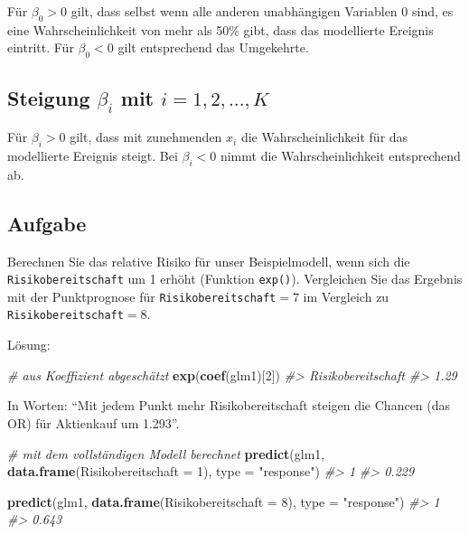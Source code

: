 \documentclass[12pt,ngerman,]{book}
\makeatletter
\newenvironment{Shaded}{\begin{snugshade}}{\end{snugshade}}
\newcommand{\KeywordTok}[1]{\textcolor[rgb]{0.13,0.29,0.53}{\textbf{{#1}}}}
\newcommand{\DataTypeTok}[1]{\textcolor[rgb]{0.13,0.29,0.53}{{#1}}}
\newcommand{\DecValTok}[1]{\textcolor[rgb]{0.00,0.00,0.81}{{#1}}}
\newcommand{\StringTok}[1]{\textcolor[rgb]{0.31,0.60,0.02}{{#1}}}
\newcommand{\CommentTok}[1]{\textcolor[rgb]{0.56,0.35,0.01}{\textit{{#1}}}}
\newcommand{\NormalTok}[1]{{#1}}
\newenvironment{kframe}{%
\medskip{}
\setlength{\fboxsep}{.8em}
 \def\at@end@of@kframe{}%
 \ifinner\ifhmode%
  \def\at@end@of@kframe{\end{minipage}}%
  \begin{minipage}{\columnwidth}%
 \fi\fi%
 \def\FrameCommand##1{\hskip\@totalleftmargin \hskip-\fboxsep
 \colorbox{shadecolor}{##1}\hskip-\fboxsep
     \hskip-\linewidth \hskip-\@totalleftmargin \hskip\columnwidth}%
 \MakeFramed {\advance\hsize-\width
   \@totalleftmargin\z@ \linewidth\hsize
   \@setminipage}}%
 {\par\unskip\endMakeFramed%
 \at@end@of@kframe}
\renewenvironment{Shaded}{\begin{kframe}}{\end{kframe}}
\theoremstyle{definition}
\theoremstyle{definition}
\theoremstyle{remark}
\makeatother
\begin{document}
Für \(\beta_0>0\) gilt, dass selbst wenn alle anderen unabhängigen
Variablen \(0\) sind, es eine Wahrscheinlichkeit von mehr als 50\% gibt,
dass das modellierte Ereignis eintritt. Für \(\beta_0<0\) gilt
entsprechend das Umgekehrte.

\subsection{\texorpdfstring{Steigung \(\beta_i\) mit
\(i=1,2,...,K\)}{Steigung \textbackslash{}beta\_i mit i=1,2,...,K}}\label{steigung-beta_i-mit-i12...k}

Für \(\beta_i>0\) gilt, dass mit zunehmenden \(x_i\) die
Wahrscheinlichkeit für das modellierte Ereignis steigt. Bei
\(\beta_i<0\) nimmt die Wahrscheinlichkeit entsprechend ab.

\subsection{Aufgabe}\label{aufgabe}

Berechnen Sie das relative Risiko für unser Beispielmodell, wenn sich
die \texttt{Risikobereitschaft} um 1 erhöht (Funktion \texttt{exp()}).
Vergleichen Sie das Ergebnis mit der Punktprognose für
\texttt{Risikobereitschaft}\(=7\) im Vergleich zu
\texttt{Risikobereitschaft}\(=8\).

Lösung:

\begin{Shaded}
\begin{Highlighting}[]
\CommentTok{# aus Koeffizient abgeschätzt}
\KeywordTok{exp}\NormalTok{(}\KeywordTok{coef}\NormalTok{(glm1)[}\DecValTok{2}\NormalTok{])}
\CommentTok{#> Risikobereitschaft }
\CommentTok{#>               1.29}
\end{Highlighting}
\end{Shaded}

In Worten: ``Mit jedem Punkt mehr Risikobereitschaft steigen die Chancen
(das OR) für Aktienkauf um 1.293''.

\begin{Shaded}
\begin{Highlighting}[]

\CommentTok{# mit dem vollständigen Modell berechnet}
\KeywordTok{predict}\NormalTok{(glm1, }\KeywordTok{data.frame}\NormalTok{(}\DataTypeTok{Risikobereitschaft =} \DecValTok{1}\NormalTok{), }
        \DataTypeTok{type =} \StringTok{"response"}\NormalTok{)}
\CommentTok{#>     1 }
\CommentTok{#> 0.229}

\KeywordTok{predict}\NormalTok{(glm1, }\KeywordTok{data.frame}\NormalTok{(}\DataTypeTok{Risikobereitschaft =} \DecValTok{8}\NormalTok{), }
        \DataTypeTok{type =} \StringTok{"response"}\NormalTok{)}
\CommentTok{#>     1 }
\CommentTok{#> 0.643}
\end{Highlighting}
\end{Shaded}
\end{document}
